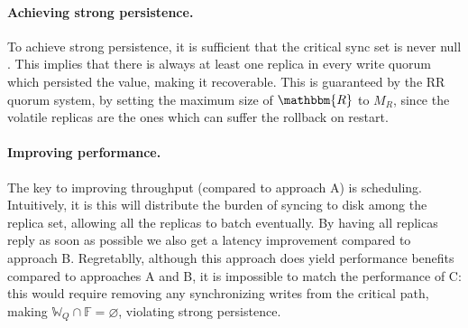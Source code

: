 \paragraph{Achieving strong persistence.} To achieve strong
persistence, it is sufficient that the critical sync set is
never null . This implies that there is always at least one
replica in every write quorum which persisted the value, making
it recoverable. This is guaranteed by the \ac{RR} quorum
system, by setting the maximum size of $\mathbbm{R}$ to $M_R$,
since the volatile replicas are the ones which can suffer the rollback on
restart.

\paragraph{Improving performance.}The key to improving throughput
(compared to approach A) is scheduling. Intuitively, it is
this will distribute the burden of syncing to disk among the
replica set, allowing all the replicas to batch eventually. By
having all replicas reply as soon as possible we also get a
latency improvement compared to approach B. Regretablly, although
this approach does yield performance benefits compared to
approaches A and B, it is impossible to match the performance of
C\@: this would require removing any synchronizing writes from the
critical path, making $\mathbb{W}_Q \cap \mathbb{F} =
\varnothing$, violating strong persistence.


